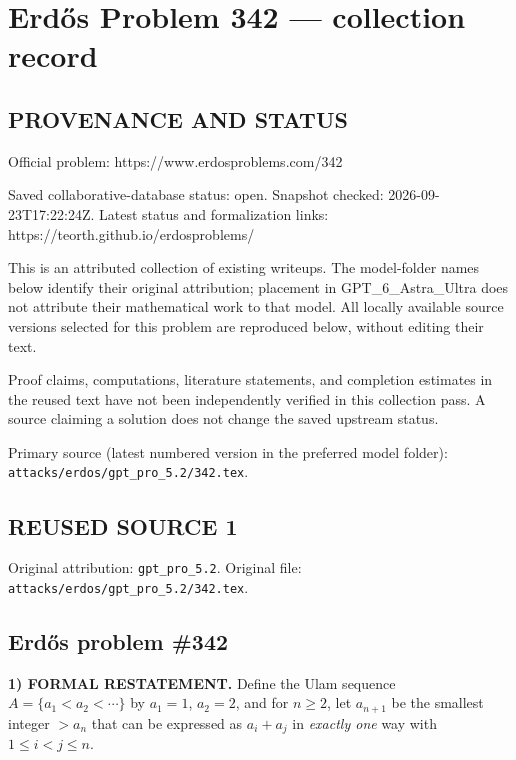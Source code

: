 \section*{Erd\H{o}s Problem 342 --- collection record}

\subsection*{PROVENANCE AND STATUS}
Official problem: https://www.erdosproblems.com/342

Saved collaborative-database status: open.
Snapshot checked: 2026-09-23T17:22:24Z.
Latest status and formalization links: https://teorth.github.io/erdosproblems/

This is an attributed collection of existing writeups. The model-folder names below identify their original attribution; placement in GPT\_6\_Astra\_Ultra does not attribute their mathematical work to that model. All locally available source versions selected for this problem are reproduced below, without editing their text.

Proof claims, computations, literature statements, and completion estimates in the reused text have not been independently verified in this collection pass. A source claiming a solution does not change the saved upstream status.

Primary source (latest numbered version in the preferred model folder): \texttt{attacks/erdos/gpt\_pro\_5.2/342.tex}.

\subsection*{REUSED SOURCE 1}
Original attribution: \texttt{gpt\_pro\_5.2}.
Original file: \texttt{attacks/erdos/gpt\_pro\_5.2/342.tex}.

\subsection*{Erd\H{o}s problem \#342}

\noindent\textbf{1) FORMAL RESTATEMENT.}
Define the Ulam sequence $A=\{a_1<a_2<\cdots\}$ by $a_1=1$, $a_2=2$, and for $n\ge 2$, let $a_{n+1}$ be the smallest integer $>a_n$ that can be expressed as $a_i+a_j$ in \emph{exactly one} way with $1\le i<j\le n$.

